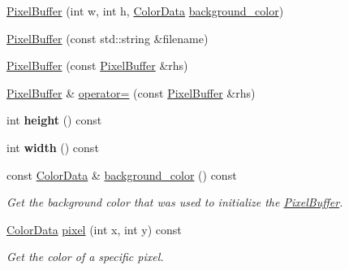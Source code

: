 \begin{DoxyCompactItemize}
\item 
\hyperlink{classimage__tools_1_1PixelBuffer_a4f5b5df93389946d70bc001acfebcedb}{Pixel\+Buffer} (int w, int h, \hyperlink{classimage__tools_1_1ColorData}{Color\+Data} \hyperlink{classimage__tools_1_1PixelBuffer_a3d6b71aeb5d7ec8a204aac67df7b83ac}{background\+\_\+color})
\item 
\hyperlink{classimage__tools_1_1PixelBuffer_a22e3446de759c42e6be6f290feca8461}{Pixel\+Buffer} (const std\+::string \&filename)
\item 
\hyperlink{classimage__tools_1_1PixelBuffer_a25b0c7d5686807d187ee799a5fbb1121}{Pixel\+Buffer} (const \hyperlink{classimage__tools_1_1PixelBuffer}{Pixel\+Buffer} \&rhs)
\item 
\hyperlink{classimage__tools_1_1PixelBuffer}{Pixel\+Buffer} \& \hyperlink{classimage__tools_1_1PixelBuffer_a95f63d0b72c4d0b371c556597cf77578}{operator=} (const \hyperlink{classimage__tools_1_1PixelBuffer}{Pixel\+Buffer} \&rhs)
\item 
\mbox{\label{classimage__tools_1_1PixelBuffer_ab2bd64291a4275421bc72268da2143be}} 
int {\bfseries height} () const
\item 
\mbox{\label{classimage__tools_1_1PixelBuffer_a80cdd8ef54915b4549f8c6fc86f6dccc}} 
int {\bfseries width} () const
\item 
const \hyperlink{classimage__tools_1_1ColorData}{Color\+Data} \& \hyperlink{classimage__tools_1_1PixelBuffer_a3d6b71aeb5d7ec8a204aac67df7b83ac}{background\+\_\+color} () const
\begin{DoxyCompactList}\small\item\em Get the background color that was used to initialize the \hyperlink{classimage__tools_1_1PixelBuffer}{Pixel\+Buffer}. \end{DoxyCompactList}\item 
\mbox{\label{classimage__tools_1_1PixelBuffer_a4321d9a8751015b998ce51c59f0a94b9}} 
\hyperlink{classimage__tools_1_1ColorData}{Color\+Data} \hyperlink{classimage__tools_1_1PixelBuffer_a4321d9a8751015b998ce51c59f0a94b9}{pixel} (int x, int y) const
\begin{DoxyCompactList}\small\item\em Get the color of a specific pixel. \end{DoxyCompactList}\item 

\end{DoxyCompactItemize}
